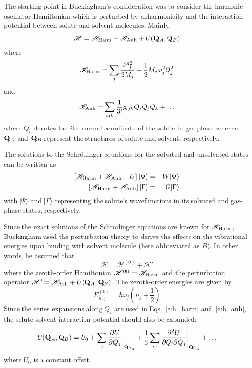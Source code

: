 \documentclass[a4paper,titlepage,twoside,fleqn,12pt]{book}
\begin{document}
\begin{refsection}
The starting point in Buckingham's consideration was to consider 
the harmonic oscillator Hamiltonian which is perturbed by anharmonicity
and the interaction potential between solute and solvent molecules. Mainly,
%
\begin{equation}
\mathscr{H} = \mathscr{H}_{\rm Harm} + \mathscr{H}_{\rm Anh} + U({\bf Q}_A,{\bf Q}_B)
\end{equation}
%
where
%
\begin{equation}\label{e:h_harm}
\mathscr{H}_{\rm Harm} = 
\sum_j \frac{\mathscr{P}_j^2}{2M_j} + \frac{1}{2} M_j \omega_j^2 Q_j^2
\end{equation}
%
and
%
\begin{equation}\label{e:h_anh}
\mathscr{H}_{\rm Anh} = 
\sum_{ijk} \frac{1}{3!} g_{ijk} Q_iQ_jQ_k + \ldots 
\end{equation}
%
where $Q_i$ denotes the $i$th normal coordinate of the solute in gas phase whereas
${\bf Q}_A$ and ${\bf Q}_B$ represent the structures of solute and solvent, 
respectively.

The solutions to the Schr{\"o}dinger equations for the solvated and 
unsolvated states can be written as
%
\begin{eqnarray}
\left[ \mathscr{H}_{\rm Harm} + \mathscr{H}_{\rm Anh} + U \right] 
\vert \Psi \rangle &=& W \vert \Psi \rangle \\
\left[ \mathscr{H}_{\rm Harm} + \mathscr{H}_{\rm Anh} \right] 
\vert \Gamma \rangle &=& G \vert \Gamma \rangle 
\end{eqnarray}
%
with $\vert\Psi\rangle$ and $\vert\Gamma\rangle$ representing the solute's wavefunctions
in its solvated and gas-phase states, respectively.

Since the exact solutions of the Schr{\"o}dinger equations are known 
for $\mathscr{H}_{\rm Harm}$, Buckingham used the perturbation theory
to derive the effects on the vibrational energies upon binding with solvent
molecule (here abbreviated as $B$).
In other words, he assumed that
%
\begin{equation} \label{e:RSPT-Hamiltonian}
\mathscr{H} = \mathscr{H}^{(0)} + \mathscr{H}'
\end{equation}
%
where the zeroth\hyp{}order Hamiltonian $\mathscr{H}^{(0)}=\mathscr{H}_{\rm Harm}$
and the perturbation operator $\mathscr{H}'=\mathscr{H}_{\rm Anh} + U({\bf Q}_A,{\bf Q}_B)$.
The zeroth-order energies are given by
%
\begin{equation}
E_{n,j}^{(0)} = \hbar \omega_j \left( n_j+\frac{1}{2} \right)
\end{equation}
%
Since the series expansions along $Q_i$ are used in Eqs.~\eqref{e:h_harm}
and~\eqref{e:h_anh}, the solute\hyp{}solvent interaction potential
should also be expanded:
%
\begin{equation}\label{e:u_taylor}
U({\bf Q}_A,{\bf Q}_B) = 
U_0 + \sum_j \frac{\partial U}{\partial Q_j} \Bigg|_{{\bf Q}_{0_A}}
+ \frac{1}{2} \sum_{ij} \frac{\partial^2 U}{\partial Q_i \partial Q_j} \Bigg|_{{\bf Q}_{0_A}}
+ \ldots
\end{equation}
%
where $U_0$ is a constant offset. 


\end{refsection}
\end{document}
